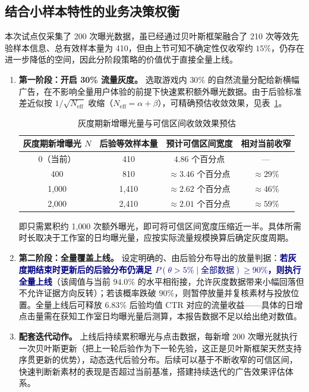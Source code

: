 \documentclass[12pt,a4paper,UTF8,fontset=none]{ctexart}
\newcommand{\thead}[1]{\sffamily\bfseries\color{navy}#1}
\newcommand{\tht}{\theta}
\newcommand{\emphc}[1]{\textcolor{navy}{\textbf{#1}}}
\begin{document}
\subsection{结合小样本特性的业务决策权衡}

本次试点仅采集了 200 次曝光数据，虽已经通过贝叶斯框架融合了 210 次等效先验样本信息、总有效样本量为 410，但由上节可知不确定性仅收窄约 $15\%$，仍存在进一步降低的空间，因此分阶段策略的价值优于直接全量上线。

\begin{enumerate}
  \item \textbf{第一阶段：开启 30\% 流量灰度。}
    选取游戏内 $30\%$ 的自然流量分配给新横幅广告，在不影响全量用户体验的前提下快速累积额外曝光数据。由于后验标准差近似按 $1/\sqrt{N_{\text{eff}}}$ 收缩（$N_{\text{eff}}=\alpha+\beta$），可精确预估收敛效果，见表~\ref{tab:rollout}。

    \begin{table}[H]
    \centering
    \caption{灰度期新增曝光量与可信区间收敛效果预估}
    \label{tab:rollout}
    \begin{tabular}{cccc}
    \toprule
    \thead{灰度期新增曝光 $N$} & \thead{后验等效样本量} & \thead{预计可信区间宽度} & \thead{相对当前收窄} \\
    \midrule
    0（当前） & 410   & $4.86$ 个百分点        & ---            \\
    \rowcolor{softbg} 400       & 810   & $\approx 3.46$ 个百分点 & $\approx 29\%$ \\
    1{,}000   & 1{,}410 & $\approx 2.62$ 个百分点 & $\approx 46\%$ \\
    \rowcolor{softbg} 2{,}000   & 2{,}410 & $\approx 2.01$ 个百分点 & $\approx 59\%$ \\
    \bottomrule
    \end{tabular}
    \end{table}

    即只需累积约 1{,}000 次额外曝光，即可将可信区间宽度压缩近一半。具体所需时长取决于工作室的日均曝光量，应按实际流量规模换算后确定灰度周期。

  \item \textbf{第二阶段：全量覆盖上线。}
    设定明确的、由后验分布导出的放量判据：\emphc{若灰度期结束时更新后的后验分布仍满足 $P(\tht>5\%\mid\text{全部数据})\ge 90\%$，则执行全量上线}（该阈值与当前 $94.0\%$ 的水平相衔接，允许灰度数据带来小幅回落但不允许证据方向反转）；若该概率跌破 $90\%$，则暂停放量并复核素材与投放位置。全量上线后可释放 $6.83\%$ 后验均值 CTR 对应的流量收益——具体的日增点击量需在获知工作室日均曝光量后测算，本报告数据不足以给出绝对数值。

  \item \textbf{配套迭代动作。}
    上线后持续累积曝光与点击数据，每新增 200 次曝光就执行一次贝叶斯更新（把上一轮后验作为下一轮先验，这正是贝叶斯框架天然支持序贯更新的优势），动态迭代后验分布。后续可以基于不断收窄的可信区间，快速判断新素材的表现是否超过当前基准，搭建持续迭代的广告效果评估体系。
\end{enumerate}
\end{document}
